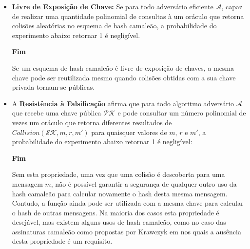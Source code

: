 \documentclass[a4paper]{article}
\begin{document}
\begin{itemize}
\item\textbf{Livre de Exposição de Chave:} Se para todo adversário
  eficiente $\mathcal{A}$, capaz de realizar uma quantidade polinomial
  de consultas à um oráculo que retorna colisões aleatórias no esquema
  de hash camaleão, a probabilidade do experimento abaixo retornar 1 é
  negligível.

\noindent
  \begin{algorithm}[H]
    \SetAlgoLined
     \textbf{Fim}
  \end{algorithm}

  Se um esquema de hash camaleão é livre de exposição de chaves, a
  mesma chave pode ser reutilizada mesmo quando colisões obtidas com a
  sua chave privada tornam-se públicas.
  
\item A \textbf{Resistência à Falsificação} afirma que para todo algoritmo
  adversário $\mathcal{A}$ que recebe uma chave pública $\mathcal{PK}$
  e pode consultar um número polinomial de vezes um oráculo que
  retorna diferentes resultados de $Collision(\mathcal{SK}, m, r, m')$
  para quaisquer valores de $m$, $r$ e $m'$, a probabilidade do
  experimento abaixo retornar 1 é negligível:

  \noindent
  \begin{algorithm}[H]
    \SetAlgoLined
     \textbf{Fim}
  \end{algorithm}

  Sem esta propriedade, uma vez que uma colisão é descoberta para uma
  mensagem $m$, não é possível garantir a segurança de qualquer outro
  uso da hash camaleão para calcular novamente o hash desta mesma
  mensagem. Contudo, a função ainda pode ser utilizada com a mesma
  chave para calcular o hash de outras mensagens. Na maioria dos casos
  esta propriedade é desejável, mas existem alguns usos de hash
  camaleão, como no caso das assinaturas camaleão como propostas por
  Krawczyk em \cite{krawczyk} nos quais a ausência desta propriedade é
  um requisito.
  

\end{itemize}
\end{document}
